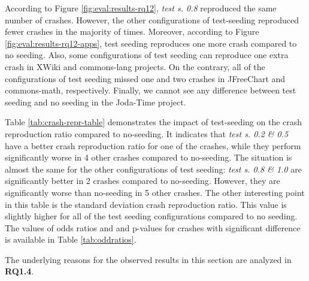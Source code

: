 According to Figure \ref{fig:eval:results-rq12}, \textit{test s. 0.8} reproduced the same number of crashes. However, the other configurations of test-seeding reproduced fewer crashes in the majority of times. Moreover, according to Figure \ref{fig:eval:results-rq12-apps}, test seeding reproduces one more crash compared to no seeding. Also, some configurations of test seeding can reproduce one extra crash in  XWiki and commons-lang projects. On the contrary, all of the configurations of test seeding missed one and two crashes in JFreeChart and commons-math, respectively. Finally, we cannot see any difference between test seeding and no seeding in the Joda-Time project.
 
 

Table \ref{tab:crash-repr-table} demonstrates the impact of test-seeding on the crash reproduction ratio compared to no-seeding. It indicates that \textit{test s. 0.2 \& 0.5} have a better crash reproduction ratio for one of the crashes, while they perform significantly worse in 4 other crashes compared to no-seeding. The situation is almost the same for the other configurations of test seeding: \textit{test s. 0.8 \& 1.0} are significantly better in 2 crashes compared to no-seeding. However, they are significantly worse than no-seeding in 5 other crashes. The other interesting point in this table is the standard deviation crash reproduction ratio. This value is slightly higher for all of the test seeding configurations compared to no seeding. The values of odds ratios and and p-values for crashes with significant difference is available in Table \ref{tab:oddratios}.

The underlying reasons for the observed results in this section are analyzed in \textbf{RQ1.4}.



